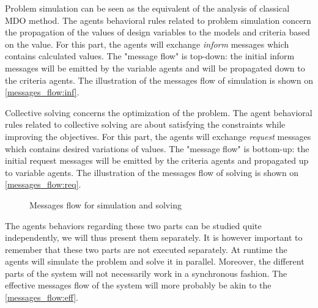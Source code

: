 Problem simulation can be seen as the equivalent of the analysis of classical MDO method. The agents behavioral rules related to problem simulation concern the propagation of the values of design variables to the models and criteria based on the value. For this part, the agents will exchange \emph{inform} messages which contains calculated values. The "message flow" is top-down: the initial inform messages will be emitted by the variable agents and will be propagated down to the criteria agents. The illustration of the messages flow of simulation is shown on \figurename{} \ref{messages_flow:inf}.

Collective solving concerns the optimization of the problem. The agent behavioral rules related to collective solving are about satisfying the constraints while improving the objectives. For this part, the agents will exchange \emph{request} messages which contains desired variations of values. The "message flow" is bottom-up: the initial request messages will be emitted by the criteria agents and propagated up to variable agents. The illustration of the messages flow of solving is shown on \figurename{} \ref{messages_flow:req}.

\begin{figure}[h]
	\hfill

	\centering
	
	\caption{Messages flow for simulation and solving}
	\label{messages_flow}

\end{figure}

The agents behaviors regarding these two parts can be studied quite independently, we will thus present them separately.  It is however important to remember that these two parts are not executed separately. At runtime the agents will simulate the problem and solve it in parallel. Moreover, the different parts of the system will not necessarily work in a synchronous fashion. The effective messages flow of the system will more probably be akin to the \figurename{} \ref{messages_flow:eff}.

